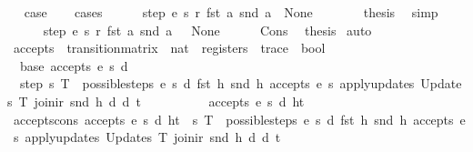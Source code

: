 \begin{isabellebody}
\ \isamarkupfalse%
\ {\isacharquery}case\isanewline
\ \ \isamarkupfalse%
\ cases\isanewline
\ \ \ \ \isamarkupfalse%
\ {\isachardoublequoteopen}step\ e\ s\ r\ {\isacharparenleft}fst\ a{\isacharparenright}\ {\isacharparenleft}snd\ a{\isacharparenright}\ {\isacharequal}\ None{\isachardoublequoteclose}\isanewline
\ \ \ \ \isamarkupfalse%
\ \isamarkupfalse%
\ {\isacharquery}thesis\ \isamarkupfalse%
\ simp\isanewline
\ \ \isamarkupfalse%
\isanewline
\ \ \ \ \isamarkupfalse%
\ {\isachardoublequoteopen}step\ e\ s\ r\ {\isacharparenleft}fst\ a{\isacharparenright}\ {\isacharparenleft}snd\ a{\isacharparenright}\ {\isasymnoteq}\ \ None{\isachardoublequoteclose}\isanewline
\ \ \ \ \isamarkupfalse%
\ Cons\ \isamarkupfalse%
\ {\isacharquery}thesis\ \isamarkupfalse%
{\isacharparenleft}auto{\isacharparenright}\isanewline
\ \ \isamarkupfalse%
\isanewline
{}\isamarkupfalse%
%
\endisatagproof
{\isafoldproof}%
%
\isadelimproof
\isanewline
%
\endisadelimproof
\isanewline
{}\isamarkupfalse%
\ accepts\ {\isacharcolon}{\isacharcolon}\ {\isachardoublequoteopen}transition{\isacharunderscore}matrix\ {\isasymRightarrow}\ nat\ {\isasymRightarrow}\ registers\ {\isasymRightarrow}\ trace\ {\isasymRightarrow}\ bool{\isachardoublequoteclose}\ \isanewline
\ \ base{\isacharcolon}\ {\isachardoublequoteopen}accepts\ e\ s\ d\ {\isacharbrackleft}{\isacharbrackright}{\isachardoublequoteclose}\ {\isacharbar}\ \ \ \ \ \ \ \ \ \ \ \ \ \ \ \ \ \ \ \ \ \ \ \ \ \ \ \ \ \ \ \ \ \ \ \ \ \ \ \ \ \isanewline
\ \ step{\isacharcolon}\ {\isachardoublequoteopen}{\isasymexists}{\isacharparenleft}s{\isacharprime}{\isacharcomma}\ T{\isacharparenright}\ {\isacharbar}{\isasymin}{\isacharbar}\ possible{\isacharunderscore}steps\ e\ s\ d\ {\isacharparenleft}fst\ h{\isacharparenright}\ {\isacharparenleft}snd\ h{\isacharparenright}{\isachardot}\ accepts\ e\ s{\isacharprime}\ {\isacharparenleft}apply{\isacharunderscore}updates\ {\isacharparenleft}Updates\ T{\isacharparenright}\ {\isacharparenleft}join{\isacharunderscore}ir\ {\isacharparenleft}snd\ h{\isacharparenright}\ d{\isacharparenright}\ d{\isacharparenright}\ t\ {\isasymLongrightarrow}\isanewline
\ \ \ \ \ \ \ \ \ accepts\ e\ s\ d\ {\isacharparenleft}h{\isacharhash}t{\isacharparenright}{\isachardoublequoteclose}\isanewline
\isanewline
{}\isamarkupfalse%
\ accepts{\isacharunderscore}cons{\isacharcolon}\ {\isachardoublequoteopen}accepts\ e\ s\ d\ {\isacharparenleft}h{\isacharhash}t{\isacharparenright}\ {\isacharequal}\ {\isacharparenleft}{\isasymexists}{\isacharparenleft}s{\isacharprime}{\isacharcomma}\ T{\isacharparenright}\ {\isacharbar}{\isasymin}{\isacharbar}\ possible{\isacharunderscore}steps\ e\ s\ d\ {\isacharparenleft}fst\ h{\isacharparenright}\ {\isacharparenleft}snd\ h{\isacharparenright}{\isachardot}\ accepts\ e\ s{\isacharprime}\ {\isacharparenleft}apply{\isacharunderscore}updates\ {\isacharparenleft}Updates\ T{\isacharparenright}\ {\isacharparenleft}join{\isacharunderscore}ir\ {\isacharparenleft}snd\ h{\isacharparenright}\ d{\isacharparenright}\ d{\isacharparenright}\ t{\isacharparenright}{\isachardoublequoteclose}\isanewline

\end{isabellebody}
